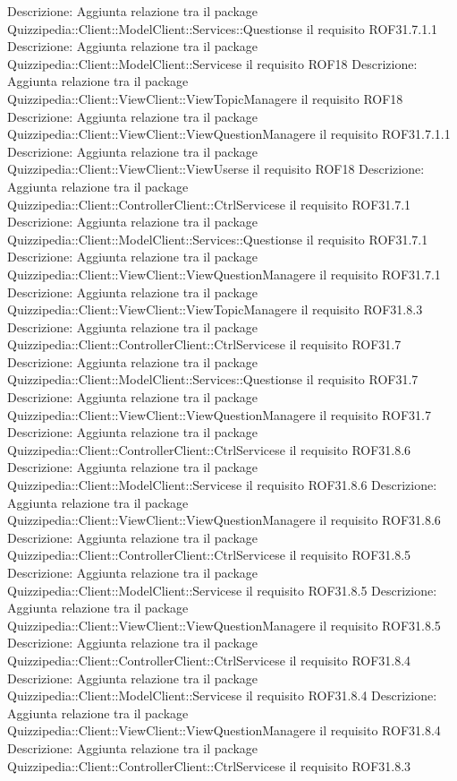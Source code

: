 Descrizione: Aggiunta relazione tra il package Quizzipedia::Client::ModelClient::Services::Questionse il requisito ROF31.7.1.1 
Descrizione: Aggiunta relazione tra il package Quizzipedia::Client::ModelClient::Servicese il requisito ROF18 
Descrizione: Aggiunta relazione tra il package Quizzipedia::Client::ViewClient::ViewTopicManagere il requisito ROF18 
Descrizione: Aggiunta relazione tra il package Quizzipedia::Client::ViewClient::ViewQuestionManagere il requisito ROF31.7.1.1 
Descrizione: Aggiunta relazione tra il package Quizzipedia::Client::ViewClient::ViewUserse il requisito ROF18 
Descrizione: Aggiunta relazione tra il package Quizzipedia::Client::ControllerClient::CtrlServicese il requisito ROF31.7.1 
Descrizione: Aggiunta relazione tra il package Quizzipedia::Client::ModelClient::Services::Questionse il requisito ROF31.7.1 
Descrizione: Aggiunta relazione tra il package Quizzipedia::Client::ViewClient::ViewQuestionManagere il requisito ROF31.7.1 
Descrizione: Aggiunta relazione tra il package Quizzipedia::Client::ViewClient::ViewTopicManagere il requisito ROF31.8.3 
Descrizione: Aggiunta relazione tra il package Quizzipedia::Client::ControllerClient::CtrlServicese il requisito ROF31.7 
Descrizione: Aggiunta relazione tra il package Quizzipedia::Client::ModelClient::Services::Questionse il requisito ROF31.7 
Descrizione: Aggiunta relazione tra il package Quizzipedia::Client::ViewClient::ViewQuestionManagere il requisito ROF31.7 
Descrizione: Aggiunta relazione tra il package Quizzipedia::Client::ControllerClient::CtrlServicese il requisito ROF31.8.6 
Descrizione: Aggiunta relazione tra il package Quizzipedia::Client::ModelClient::Servicese il requisito ROF31.8.6 
Descrizione: Aggiunta relazione tra il package Quizzipedia::Client::ViewClient::ViewQuestionManagere il requisito ROF31.8.6 
Descrizione: Aggiunta relazione tra il package Quizzipedia::Client::ControllerClient::CtrlServicese il requisito ROF31.8.5 
Descrizione: Aggiunta relazione tra il package Quizzipedia::Client::ModelClient::Servicese il requisito ROF31.8.5 
Descrizione: Aggiunta relazione tra il package Quizzipedia::Client::ViewClient::ViewQuestionManagere il requisito ROF31.8.5 
Descrizione: Aggiunta relazione tra il package Quizzipedia::Client::ControllerClient::CtrlServicese il requisito ROF31.8.4 
Descrizione: Aggiunta relazione tra il package Quizzipedia::Client::ModelClient::Servicese il requisito ROF31.8.4 
Descrizione: Aggiunta relazione tra il package Quizzipedia::Client::ViewClient::ViewQuestionManagere il requisito ROF31.8.4 
Descrizione: Aggiunta relazione tra il package Quizzipedia::Client::ControllerClient::CtrlServicese il requisito ROF31.8.3 

